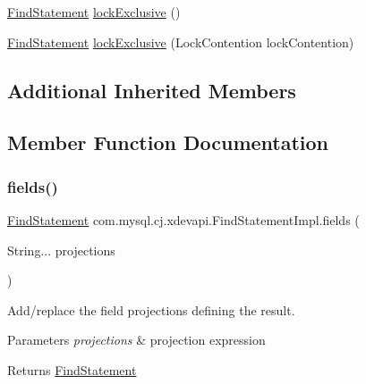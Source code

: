 \begin{DoxyCompactItemize}
\item 
\mbox{\hyperlink{interfacecom_1_1mysql_1_1cj_1_1xdevapi_1_1_find_statement}{Find\+Statement}} \mbox{\hyperlink{classcom_1_1mysql_1_1cj_1_1xdevapi_1_1_find_statement_impl_a3486c67a7e4b354ff3101b9c5734c5f1}{lock\+Exclusive}} ()
\item 
\mbox{\hyperlink{interfacecom_1_1mysql_1_1cj_1_1xdevapi_1_1_find_statement}{Find\+Statement}} \mbox{\hyperlink{classcom_1_1mysql_1_1cj_1_1xdevapi_1_1_find_statement_impl_abb488a09f4ad595edcb2725712182e38}{lock\+Exclusive}} (Lock\+Contention lock\+Contention)
\end{DoxyCompactItemize}
\subsection*{Additional Inherited Members}


\subsection{Member Function Documentation}
\mbox{\label{classcom_1_1mysql_1_1cj_1_1xdevapi_1_1_find_statement_impl_a0949083d6d4ba7dff81c2ead999373bf}} 
\subsubsection{\texorpdfstring{fields()}{fields()}\hspace{0.1cm}{\footnotesize\ttfamily [1/2]}}
{\footnotesize\ttfamily \mbox{\hyperlink{interfacecom_1_1mysql_1_1cj_1_1xdevapi_1_1_find_statement}{Find\+Statement}} com.\+mysql.\+cj.\+xdevapi.\+Find\+Statement\+Impl.\+fields (\begin{DoxyParamCaption}\item[{String...}]{projections }\end{DoxyParamCaption})}

Add/replace the field projections defining the result.


\begin{DoxyParams}{Parameters}
{\em projections} & projection expression \\
\hline
\end{DoxyParams}
\begin{DoxyReturn}{Returns}
\mbox{\hyperlink{interfacecom_1_1mysql_1_1cj_1_1xdevapi_1_1_find_statement}{Find\+Statement}} 
\end{DoxyReturn}


